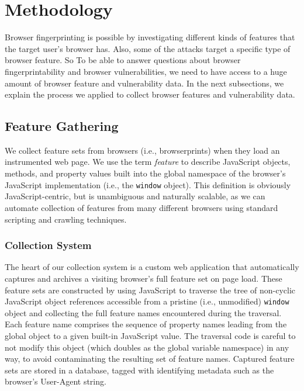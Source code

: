 \section{Methodology}
\label{sec:methodology}
Browser fingerprinting is possible by investigating different kinds of features that the target user's browser has. Also, some of the attacks target a specific type of browser feature. So To be able to answer questions about browser fingerprintability and browser vulnerabilities, we need to have access to a huge amount of browser feature and vulnerability data. In the next subsections, we explain the process we applied to collect browser features and vulnerability data.


\subsection{Feature Gathering}

We collect feature sets from browsers (i.e., browserprints) when they load an instrumented web page.
We use the term \textit{feature} to describe JavaScript objects, methods, and property values built into the global namespace of the browser's JavaScript implementation (i.e., the \texttt{window} object).
This definition is obviously JavaScript-centric, but is unambiguous and naturally scalable, as we can automate collection of features from many different browsers using standard scripting and crawling techniques.

\subsubsection{Collection System}

The heart of our collection system is a custom web application that automatically captures and archives a visiting browser's full feature set on page load.
These feature sets are constructed by using JavaScript to traverse the tree of non-cyclic JavaScript object references accessible from a pristine (i.e., unmodified) \texttt{window} object and collecting the full feature names encountered during the traversal.
Each feature name comprises the sequence of property names leading from the global object to a given built-in JavaScript value.
The traversal code is careful to not modify this object (which doubles as the global variable namespace) in any way, to avoid contaminating the resulting set of feature names.
Captured feature sets are stored in a database, tagged with identifying metadata such as the browser's User-Agent string.

